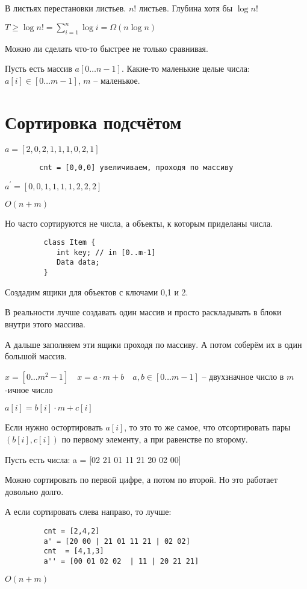 \documentclass{book}
\newcommand{\p}[1]{#1^{\prime}}
\theoremstyle{definition}
\begin{document}
     В листьях перестановки листьев. $n!$ листьев. Глубина хотя бы $\log n!$

     $T\geqslant \log n! = \sum_{i=1}^{n} \log i = \Omega(n\log n)$

     Можно ли сделать что-то быстрее не только сравнивая.

     Пусть есть массив $a[0\ldots n-1]$. Какие-то маленькие целые числа: $a[i]\in [0\ldots m-1]$, $m$ -- маленькое.

     \section{Сортировка подсчётом}

     $a = [2,0,2,1,1,1,0,2,1]$

      \begin{verbatim}
        cnt = [0,0,0] увеличиваем, проходя по массиву
     \end{verbatim}

     $\p a = [0,0,1,1,1,1,2,2,2]$

     $O(n+m)$

     Но часто сортируются не числа, а объекты, к которым приделаны числа.
      \begin{verbatim}
         class Item {
            int key; // in [0..m-1]
            Data data;
         }
     \end{verbatim} 
     Создадим ящики для объектов с ключами 0,1 и 2.

     В реальности лучше создавать один массив и просто раскладывать в блоки внутри этого массива. 

     А дальше заполняем эти ящики проходя по массиву. А потом соберём их в один большой массив.

     $x = [0\ldots m^2-1]\quad x = a\cdot m + b\quad a,b\in [0\ldots m-1]$ -- двухзначное число в $m$-ичное число

     $a[i] = b[i]\cdot m + c[i]$

     Если нужно остортировать $a[i]$, то это то же самое, что отсортировать пары $\left( b[i],c[i] \right) $ по первому элементу, а при равенстве по второму.

     Пусть есть числа: a = [02 21 01 11 21 20 02 00]


     Можно сортировать по первой цифре, а потом по второй. Но это работает довольно долго.

     А если сортировать слева направо, то лучше:

     \begin{verbatim}
         cnt = [2,4,2]
         a' = [20 00 | 21 01 11 21 | 02 02]
         cnt  = [4,1,3]
         a'' = [00 01 02 02  | 11 | 20 21 21]
     \end{verbatim}
     $O(n+m)$ 
\end{document}
